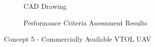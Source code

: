 \begin{figure}[H]
\centering
\begin{subfigure}[t]{.5\textwidth}
  \centering
  \caption{CAD Drawing}
  \label{fig:cad1}
\end{subfigure}%
\begin{subfigure}[t]{.5\textwidth}
  \centering
  \caption{Performance Criteria Assessment Results}
  \label{fig:radar1}
\end{subfigure}
\caption{Concept 5 - Commercially Available VTOL UAV}
\label{fig:concept2}
\end{figure}




